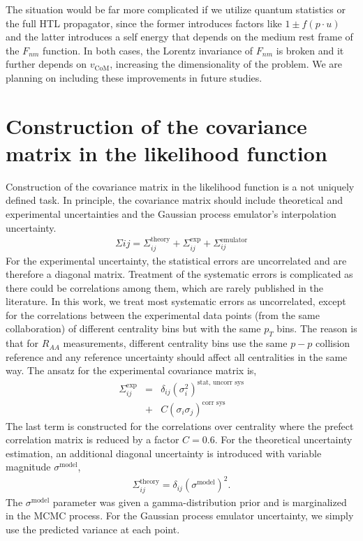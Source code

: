 \documentclass[aps, prc, reprint, amsmath, groupedaddress, nofootinbib]{revtex4-1}
\begin{document}
\begin{appendices}
The situation would be far more complicated if we utilize quantum statistics or the full HTL propagator, since the former introduces factors like $1\pm f(p\cdot u)$ and the latter introduces a self energy that depends on the medium rest frame of the $F_{nm}$ function.
In both cases, the Lorentz invariance of $F_{nm}$ is broken and it further depends on $v_{\textrm{CoM}}$, increasing the dimensionality of the problem. 
We are planning on including these improvements in future studies.

\section{Construction of the covariance matrix in the likelihood function}
\label{appendix:sigma}
Construction of the covariance matrix in the likelihood function is a not uniquely defined task.
In principle, the covariance matrix should include theoretical and experimental   uncertainties and the Gaussian process emulator's interpolation uncertainty.
\begin{eqnarray}
\Sigma{ij} = \Sigma^{\textrm{theory}}_{ij} + \Sigma^{\textrm{exp}}_{ij} + \Sigma^{\textrm{emulator}}_{ij}
\end{eqnarray}
For the experimental uncertainty, the statistical errors are uncorrelated and are therefore a diagonal matrix. 
Treatment of the systematic errors is complicated as there could be correlations among them, which are rarely published in the literature. 
In this work, we treat most systematic errors as uncorrelated, except for the correlations between the experimental data points (from the same collaboration) of different centrality bins but with the same $p_T$ bins.
The reason is that for $R_{AA}$ measurements, different centrality bins use the same $p-p$ collision reference and any reference uncertainty should affect all centralities in the same way.
The ansatz for the experimental covariance matrix is, 
\begin{eqnarray}
\Sigma^{\textrm{exp}}_{ij} &=& \delta_{ij}\left(\sigma_i^2\right)^{\textrm{stat, uncorr sys}} \nonumber\\
&+& C \left(\sigma_{i}\sigma_{j}\right)^{\textrm{corr sys}}
\end{eqnarray}
The last term is constructed for the correlations over centrality where the prefect correlation matrix is reduced by a factor $C=0.6$.
For the theoretical uncertainty estimation, an additional diagonal uncertainty is introduced with variable magnitude $\sigma^{\textrm{model}}$,
\begin{eqnarray}
\Sigma^{\textrm{theory}}_{ij} = \delta_{ij}(\sigma^{\textrm{model}})^2.
\end{eqnarray}
The $\sigma^{\textrm{model}}$ parameter was given a gamma-distribution prior and is marginalized in the MCMC process.
For the Gaussian process emulator uncertainty, we simply use the predicted variance at each point.
\end{appendices}
 
\end{document}
